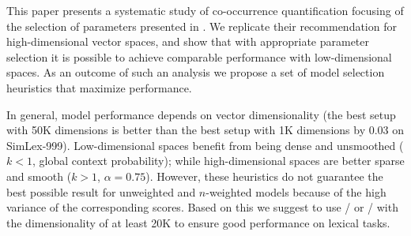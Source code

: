 \documentclass[11pt]{article}
\begin{document}
This paper presents a systematic study of co-occurrence quantification focusing of the selection of parameters presented in . We replicate their recommendation for high-dimensional vector spaces, and show that with appropriate parameter selection it is possible to achieve comparable performance with low-dimensional spaces. As an outcome of such an analysis we propose a set of model selection heuristics that maximize performance.

In general, model performance depends on vector dimensionality (the best setup with 50K dimensions is better than the best setup with 1K dimensions by 0.03 on SimLex-999). Low-dimensional spaces benefit from being dense and unsmoothed  ($k < 1$, global context probability); while high-dimensional spaces are better sparse and smooth  ($k > 1$, $\alpha = 0.75$). However, these heuristics do not guarantee the best possible result for unweighted and $n$-weighted models because of the high variance of the corresponding scores. Based on this we suggest to use \logNSPMI/ or \logNSCPMI/ with the dimensionality of at least 20K to ensure good performance on lexical tasks.

%
% 

\balance

\end{document}
